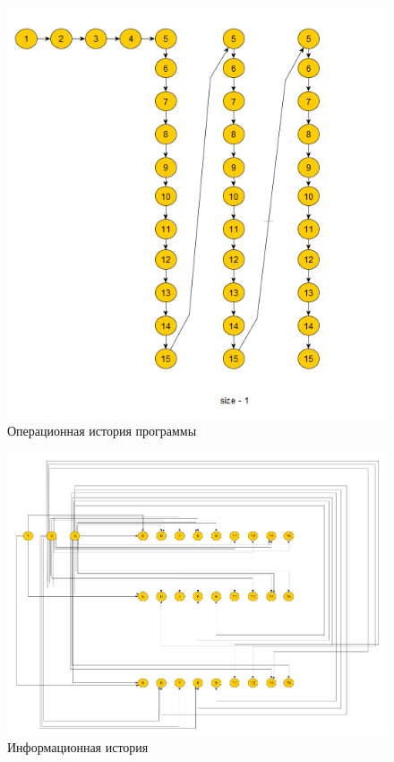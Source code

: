 \begin{figure}[h]
	\centering
	\includegraphics[height=0.5\textheight]{img/OI.png}
	\caption{Операционная история программы}
	\label{fig:oi}
\end{figure}
\begin{figure}[h]
	\centering
	\includegraphics[height=0.45\textheight]{img/II.png}
	\caption{Информационная история}
	\label{fig:ii}
\end{figure}
\clearpage

